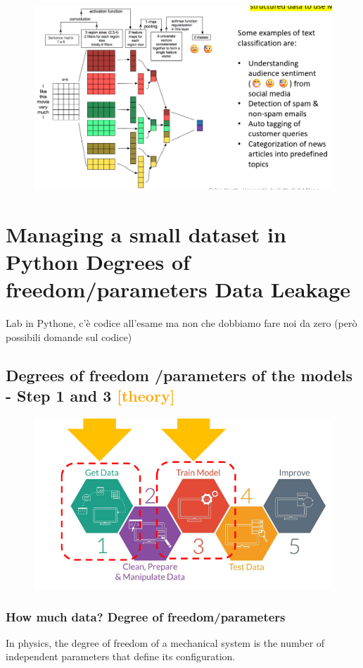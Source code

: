 \begin{figure}[H]
    \centering
    \includegraphics[width=0.8\linewidth]{07-08/images/unstructured data.png}
\end{figure}



\chapter{Managing a small dataset in Python Degrees of freedom/parameters Data Leakage}
Lab in Pythone, c'è codice all'esame ma non che dobbiamo fare noi da zero (però possibili domande sul codice)


\section{Degrees of freedom /parameters of the models - Step 1 and 3 \textcolor{orange}{[theory]}}


\begin{figure}[H]
    \centering
    \includegraphics[width=0.8\linewidth]{07-08/images/step 1 and 3.png}
\end{figure}

\subsection{How much data? Degree of freedom/parameters}
\noindent In physics, the degree of freedom of a mechanical system is the number of independent parameters that define its configuration.

